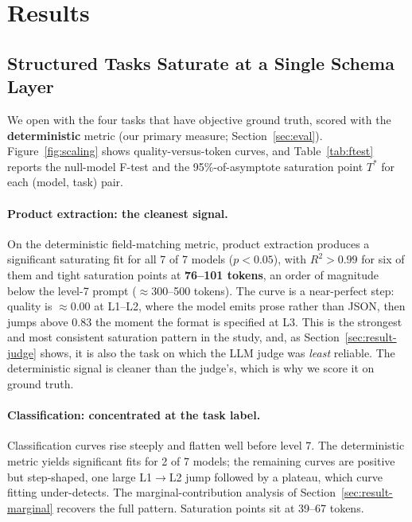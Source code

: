 \section{Results}
\label{sec:results}

\subsection{Structured Tasks Saturate at a Single Schema Layer}
\label{sec:result-curves}

We open with the four tasks that have objective ground truth, scored with the
\textbf{deterministic} metric (our primary measure; Section~\ref{sec:eval}).
Figure~\ref{fig:scaling} shows quality-versus-token curves, and
Table~\ref{tab:ftest} reports the null-model F-test and the 95\%-of-asymptote
saturation point $T^*$ for each (model, task) pair.

\paragraph{Product extraction: the cleanest signal.}
On the deterministic field-matching metric, product extraction produces a
significant saturating fit for all 7 of 7 models ($p < 0.05$), with $R^2 >
0.99$ for six of them and tight saturation points at \textbf{76--101 tokens},
an order of magnitude below the level-7 prompt ($\approx$300--500 tokens).
The curve is a near-perfect step: quality is $\approx 0.00$ at L1--L2, where the
model emits prose rather than JSON, then jumps above $0.83$ the moment the
format is specified at L3.
This is the strongest and most consistent saturation pattern in the study, and,
as Section~\ref{sec:result-judge} shows, it is also the task on which the LLM
judge was \emph{least} reliable. The deterministic signal is cleaner than the
judge's, which is why we score it on ground truth.

\paragraph{Classification: concentrated at the task label.}
Classification curves rise steeply and flatten well before level 7.
The deterministic metric yields significant fits for 2 of 7 models; the
remaining curves are positive but step-shaped, one large L1$\to$L2 jump followed
by a plateau, which curve fitting under-detects. The marginal-contribution
analysis of Section~\ref{sec:result-marginal} recovers the full pattern.
Saturation points sit at 39--67 tokens.

